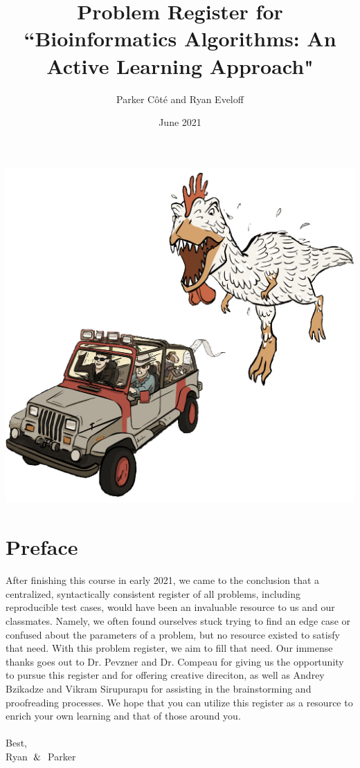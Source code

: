 \documentclass{article}
\title{Problem Register for ``Bioinformatics Algorithms: An Active Learning Approach"}
\author{Parker Côté and Ryan Eveloff}
\date{June 2021}
\begin{document}
\maketitle
\begin{center}
    \includegraphics[scale=0.25]{c0_transparent.png}
\end{center}
\pagebreak

\section*{Preface}
After finishing this course in early 2021, we came to the conclusion that a centralized, syntactically consistent register of all problems, including reproducible test cases, would have been an invaluable resource to us and our classmates. Namely, we often found ourselves stuck trying to find an edge case or confused about the parameters of a problem, but no resource existed to satisfy that need. With this problem register, we aim to fill that need. Our immense thanks goes out to Dr. Pevzner and Dr. Compeau for giving us the opportunity to pursue this register and for offering creative direciton, as well as Andrey Bzikadze and Vikram Sirupurapu for assisting in the brainstorming and proofreading processes.
We hope that you can utilize this register as a resource to enrich your own learning and that of those around you. \\ \\
\noindent Best, \\
\noindent Ryan $\And$ Parker
\end{document}
